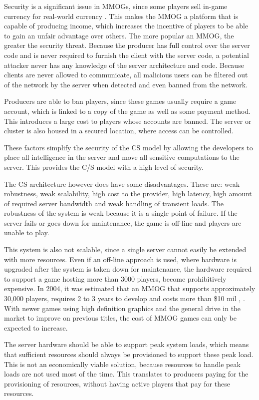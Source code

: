\documentclass[journal,oneside,a4paper,onecolumn]{IEEEtran}
\begin{document}
Security is a significant issue in MMOGs, since some players sell in-game currency for real-world currency \cite{chinese_gold_farmer}. This makes the MMOG a platform that is capable of producing income, which increases the incentive of players to be able to gain an unfair advantage over others. The more popular an MMOG, the greater the security threat. Because the producer has full control over the server code and is never required to furnish the client with the server code, a potential attacker never has any knowledge of the server architecture and code. Because clients are never allowed to communicate, all malicious users can be filtered out of the network by the server when detected and even banned from the network.

Producers are able to ban players, since these games usually require a game account, which is linked to a copy of the game as well as some payment method. This introduces a large cost to players whose accounts are banned. The server or cluster is also housed in a secured location, where access can be controlled.

These factors simplify the security of the \ac{CS} model by allowing the developers to place all intelligence in the server and move all sensitive computations to the server. This provides the C/S model with a high level of security.

The \ac{CS} architecture however does have some disadvantages. These are: weak robustness, weak scalability, high cost to the provider, high latency, high amount of required server bandwidth and weak handling of transient loads. The robustness of the system is weak because it is a single point of failure. If the server fails or goes down for maintenance, the game is off-line and players are unable to play.

This system is also not scalable, since a single server cannot easily be extended with more resources. Even if an off-line approach is used, where hardware is upgraded after the system is taken down for maintenance, the hardware required to support a game hosting more than 3000 players, become prohibitively expensive. In 2004, it was estimated that an MMOG that supports approximately 30,000 players, requires 2 to 3 years to develop and costs more than \$10 mil \cite{cs_mmog_cost}, \cite{igda_online_whitepaper}. With newer games using high definition graphics and the general drive in the market to improve on previous titles, the cost of MMOG games can only be expected to increase.

The server hardware should be able to support peak system loads, which means that sufficient resources should always be provisioned to support these peak load. This is not an economically viable solution, because resources to handle peak loads are not used most of the time. This translates to producers paying for the provisioning of resources, without having active players that pay for these resources.
\end{document}
